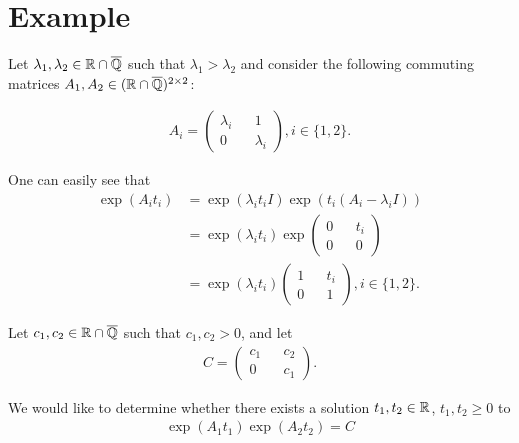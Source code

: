 \section{Example}

Let $\lambda_{1}, \lambda_{2} \in \mathbb{R} \cap \overline{\mathbb{Q}}$ such that $\lambda_{1} > \lambda_{2}$ and consider the following commuting matrices $A_{1}, A_{2} \in (\mathbb{R} \cap \overline{\mathbb{Q}})^{2 \times 2}$:

\begin{align*}
A_{i} = \begin{pmatrix} \lambda_{i} && 1 \\ 0 && \lambda_{i} \end{pmatrix}, i \in \lbrace 1, 2 \rbrace .
\end{align*}

One can easily see that
\begin{align*}
\exp(A_{i} t_{i}) &= \exp(\lambda_{i} t_{i} I) \exp(t_{i} (A_{i} - \lambda_{i} I)) \\
&= \exp(\lambda_{i} t_{i})
\exp \begin{pmatrix} 0 && t_{i} \\ 0 && 0 \end{pmatrix} \\
&= \exp (\lambda_{i} t_{i})
\begin{pmatrix} 1 && t_{i} \\ 0 && 1 \end{pmatrix}, i \in \lbrace 1, 2 \rbrace .
\end{align*}

Let $c_{1}, c_{2} \in \mathbb{R} \cap \overline{\mathbb{Q}}$ such that $c_{1}, c_{2} > 0$, and let
\begin{align*}
C = \begin{pmatrix} c_{1} && c_{2} \\ 0 && c_{1} \end{pmatrix} .
\end{align*}

We would like to determine whether there exists a solution $t_{1}, t_{2} \in \mathbb{R}$, $t_{1}, t_{2} \geq 0$ to
\begin{align*}
\exp(A_{1} t_{1}) \exp(A_{2} t_{2}) = C
\end{align*}

